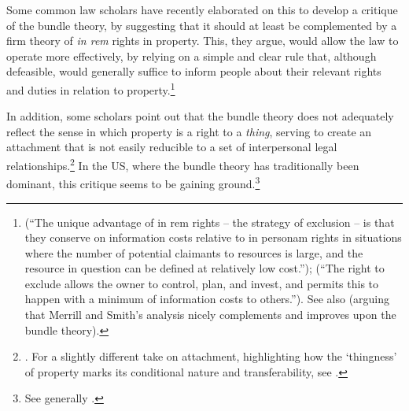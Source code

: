 
Some common law scholars have recently elaborated on this to develop a critique of the bundle theory, by suggesting that it should at least be complemented by a firm theory of {\it in rem} rights in property. This, they argue, would allow the law to operate more effectively, by relying on a simple and clear rule that, although defeasible, would generally suffice to inform people about their relevant rights and duties in relation to property.\footnote{\cite[793]{merrill01b} (``The unique advantage of in rem rights -- the strategy of exclusion -- is that they conserve on information costs relative to in personam rights in situations where the number of potential claimants to resources is large, and the resource in question can be defined at relatively low cost.''); \cite[389]{merrill01} (``The right to exclude allows the owner to control, plan, and invest, and permits this to happen with a minimum of information costs to others.''). See also \cite{ellickson11} (arguing that Merrill and Smith's analysis nicely complements and improves upon the bundle theory).} 

In addition, some scholars point out that the bundle theory does not adequately reflect the sense in which property is a right to a {\it thing}, serving to create an attachment that is not easily reducible to a set of interpersonal legal relationships.\footnote{\cite[1862]{merrill07}. For a slightly different take on attachment, highlighting how the `thingness' of property marks its conditional nature and transferability, see \cite[799-818]{penner96}.} In the US, where the bundle theory has traditionally been dominant, this critique seems to be gaining ground.\footnote{See generally \cite{klein11}.}

